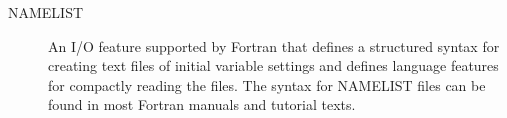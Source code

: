 
\begin{description}

\item [NAMELIST] \label{glos:nml} An I/O feature supported by Fortran that
defines a structured syntax for creating text files of initial variable
settings and defines language features for compactly reading the files.
The syntax for NAMELIST files can be found in most Fortran manuals 
and tutorial texts.

\end{description}



